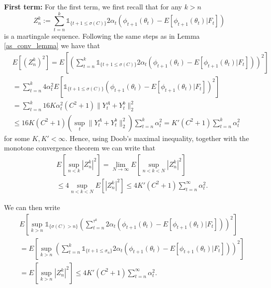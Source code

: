 \documentclass[11pt]{article}
\begin{document}
{\bf First term:} For the first term, we first recall that for any $k> n$ $$ Z_n^k:=\sum_{t=n}^{k} \mathds{1}_{\{ t+1\leq \sigma(C)\}}2\alpha_t \left(\phi_{t+1}(\theta_t)-E[\phi_{t+1}(\theta_t)|F_t]\right)$$ is a martingale sequence.  Following the same steps as in Lemma \ref{as_conv_lemma} we have that
\begin{align*}
&E[(Z_n^k)^2]=E\left[ \left( \sum_{t=n}^{k} \mathds{1}_{\{ t+1\leq \sigma(C)\}}2\alpha_t \left(\phi_{t+1}(\theta_t)-E[\phi_{t+1}(\theta_t)|F_t]\right)\right)^2\right]\\
&= \sum_{t=n}^{k} 4\alpha^2_t E\left[\mathds{1}_{\{ t+1\leq \sigma(C)\}} \left(\phi_{t+1}(\theta_t)-E[\phi_{t+1}(\theta_t)|F_t]\right)^2\right]\\
&= \sum_{t=n}^{k} 16 K \alpha^2_t (C^2 + 1)\|Y_t^A + Y_t^b\|_2^2  \\
&\leq 16K (C^2 + 1)\left(\sup_t\|Y_t^A + Y_t^b\|_2^2 \right)\sum_{t=n}^{k}  \alpha^2_t = K' (C^2 + 1) \sum_{t=n}^{k}  \alpha^2_t
\end{align*}
for some $K,K'<\infty$. Hence,  using Doob's maximal inequality, together with the monotone convergence theorem we can write that 
\begin{align*}
&E[\sup_{n<k}|Z_n^k|^2] = \lim_{N\to\infty}E\left[ \sup_{n<k<N}|Z_n^k|^2\right] \\
& \leq 4  \sup_{n<k<N} E[|Z_n^k|^2] \leq 4K' (C^2 + 1) \sum_{t=n}^{\infty}  \alpha^2_t.
\end{align*}

We can then write
\begin{align*}
&E\left[\sup_{k>n} \mathds{1}_{\{\sigma(C)>n\}} \left( \sum_{t=n}^{\tau^k}2\alpha_t \left(\phi_{t+1}(\theta_t)-E[\phi_{t+1}(\theta_t)|F_t]\right)\right)^2\right]\\
&= E\left[\sup_{k>n}  \left( \sum_{t=n}^{k} \mathds{1}_{\{ t+1\leq \sigma_n\}}2\alpha_t \left(\phi_{t+1}(\theta_t)-E[\phi_{t+1}(\theta_t)|F_t]\right)\right)^2\right]\\
&= E\left[\sup_{k>n} |Z_n^k|^2  \right]\leq  4K' (C^2 + 1) \sum_{t=n}^{\infty}  \alpha^2_t.
\end{align*}
\end{document}
